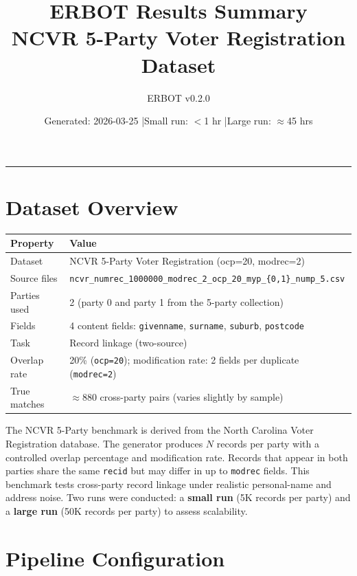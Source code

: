 \documentclass[11pt, a4paper]{article}
\title{\textbf{ERBOT Results Summary}\\[4pt]
       \large NCVR 5-Party Voter Registration Dataset}
\author{ERBOT v0.2.0}
\date{Generated: 2026-03-25 \quad|\quad Small run: $<$1 hr \quad|\quad Large run: $\approx$45 hrs}
\begin{document}
\maketitle
\tableofcontents
\vspace{1em}
\hrule
\vspace{1em}

\section{Dataset Overview}

\begin{table}[h!]
\centering
\begin{tabular}{ll}
\toprule
\textbf{Property} & \textbf{Value} \\
\midrule
Dataset      & NCVR 5-Party Voter Registration (ocp=20, modrec=2) \\
Source files & \texttt{ncvr\_numrec\_1000000\_modrec\_2\_ocp\_20\_myp\_\{0,1\}\_nump\_5.csv} \\
Parties used & 2 (party 0 and party 1 from the 5-party collection) \\
Fields       & 4 content fields: \texttt{givenname}, \texttt{surname}, \texttt{suburb}, \texttt{postcode} \\
Task         & Record linkage (two-source) \\
Overlap rate & 20\% (\texttt{ocp=20}); modification rate: 2 fields per duplicate (\texttt{modrec=2}) \\
True matches & $\approx$880 cross-party pairs (varies slightly by sample) \\
\bottomrule
\end{tabular}
\end{table}

The NCVR 5-Party benchmark is derived from the North Carolina Voter Registration
database. The generator produces $N$ records per party with a controlled overlap
percentage and modification rate. Records that appear in both parties share the
same \texttt{recid} but may differ in up to \texttt{modrec} fields. This benchmark
tests cross-party record linkage under realistic personal-name and address noise.
Two runs were conducted: a \textbf{small run} (5K records per party) and a
\textbf{large run} (50K records per party) to assess scalability.

\section{Pipeline Configuration}
\end{document}
